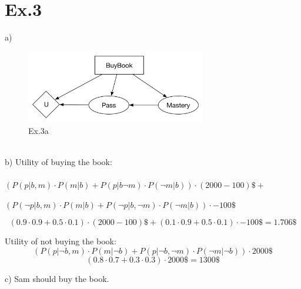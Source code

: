 \documentclass[11pt]{article}
\begin{document}
\section*{Ex.3}
a) \\
\begin{figure}[ht]
	\centering
  \includegraphics[width=0.7\textwidth]{DecisionNetwork}
	\caption{Ex.3a}
	\label{fig:3}
\end{figure}
\\
b) Utility of buying the book: \\ \\
$(P(p|b,m) \cdot P(m|b) + P(p|b\neg m) \cdot P(\neg m|b)) \cdot (2000-100)\$ + $

$(P(\neg p|b, m) \cdot P(m|b) + P(\neg p|b,\neg m) \cdot P(\neg m|b)) \cdot -100\$$

$$(0.9 \cdot 0.9 + 0.5 \cdot 0.1) \cdot (2000-100)\$ +  (0.1 \cdot 0.9 + 0.5 \cdot 0.1) \cdot -100\$ = 1.706\$ $$

Utility of not buying the book:
$$(P(p|\neg b,m) \cdot P(m|\neg b) + P(p|\neg b, \neg m) \cdot P(\neg m|\neg b)) \cdot 2000\$ $$
$$ (0.8 \cdot 0.7 + 0.3 \cdot 0.3) \cdot 2000\$ = 1300\$$$

c) Sam should buy the book. 
\end{document}
